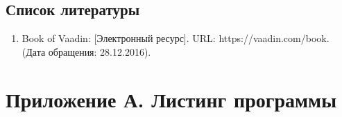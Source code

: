 \documentclass{article}
\begin{document}
\begin{spacing}{2.0}
\section*{Список литературы}
\begin{enumerate}
	\item Book of Vaadin: [Электронный ресурс]. URL: https://vaadin.com/book. (Дата обращения: 28.12.2016).
\end{enumerate}	
\end{spacing}
\pagebreak
\section*{Приложение А. Листинг программы}

















\end{document}
